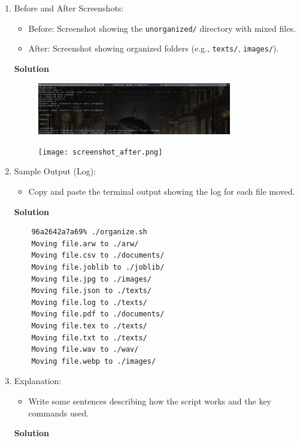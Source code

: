 \documentclass{article}
\newcommand{\solution}{\textbf{\large Solution}}
\theoremstyle{remark}
\begin{document}
\begin{enumerate}
    \item Before and After Screenshots:
    \begin{itemize}
        \item Before: Screenshot showing the \texttt{unorganized/} directory with mixed files.
        \item After: Screenshot showing organized folders (e.g., \texttt{texts/}, \texttt{images/}).
    \end{itemize}
    \solution

    \begin{figure}[h!]
        \centering
        \includegraphics[width=0.8\textwidth]{screenshot_before.png}
    \end{figure}

    \begin{figure}[h!]
        \centering
        \texttt{[image: screenshot\_after.png]}
    \end{figure}

    \item Sample Output (Log):
    \begin{itemize}
        \item Copy and paste the terminal output showing the log for each file moved.
    \end{itemize}
    \solution

    \begin{verbatim}
    96a2642a7a69% ./organize.sh 
    Moving file.arw to ./arw/
    Moving file.csv to ./documents/
    Moving file.joblib to ./joblib/
    Moving file.jpg to ./images/
    Moving file.json to ./texts/
    Moving file.log to ./texts/
    Moving file.pdf to ./documents/
    Moving file.tex to ./texts/
    Moving file.txt to ./texts/
    Moving file.wav to ./wav/
    Moving file.webp to ./images/
    \end{verbatim}

    \item Explanation:
    \begin{itemize}
        \item Write some sentences describing how the script works and the key commands used.
    \end{itemize}
    \solution


\end{enumerate}
\end{document}
